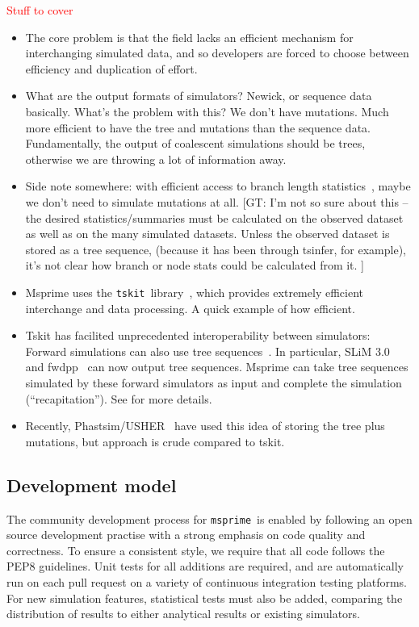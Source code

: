 \documentclass{article}
\newcommand{\msprime}[0]{\texttt{msprime}}
\newcommand{\tskit}[0]{\texttt{tskit}}
\newcommand{\jkcomment}[1]{\textcolor{red}{#1}}
\begin{document}
\jkcomment{Stuff to cover}
\begin{itemize}

\item The core problem is that the field lacks an efficient mechanism for
    interchanging simulated data, and so developers are forced to choose
    between efficiency and duplication of effort.

\item What are the output formats of simulators? Newick, or sequence data
    basically. What's the problem with this? We don't have mutations.
    Much more efficient to have the tree and mutations than the
    sequence data. Fundamentally, the output of coalescent simulations
    should be trees, otherwise we are throwing a lot of information
    away.

\item Side note somewhere: with efficient access to branch length
    statistics~\citep{ralph2019efficiently}, maybe we don't need to
    simulate mutations at all.
[GT: I'm not so sure about this -- the desired statistics/summaries
must be calculated on the observed dataset as well as on the many
simulated datasets.
Unless the observed dataset is stored as a tree sequence,
(because it has been through tsinfer, for example),
it's not clear how branch or node stats could be calculated
from it.
]

\item Msprime uses the \tskit\ library~\citep{tskit2021tskit}, which provides
    extremely efficient interchange and data processing. A quick example
    of how efficient.

\item Tskit has facilited unprecedented interoperability between simulators:
    Forward simulations can also use tree
    sequences~\citep{kelleher2018efficient,haller2018tree}. In particular, SLiM
    3.0~\citep{haller2019slim} and fwdpp~\citep{thornton2014cpp} can now output
    tree sequences. Msprime can take tree sequences simulated by these forward
    simulators as input and complete the simulation (``recapitation'').
    See \cite{haller2018tree} for more details.

\item Recently, Phastsim/USHER~\cite{demaio2021phastsim,turakhia2021ultrafast}
    have used this idea of storing the
    tree plus mutations, but approach is crude compared to tskit.

\end{itemize}

\subsection{Development model}
The community development process for \msprime\ is enabled by following an
open source development practise with a strong emphasis on code quality
and correctness. To ensure a consistent style, we require that all code
follows the PEP8 guidelines. Unit tests for all additions are required, and
are automatically run on each pull request on a variety of continuous
integration testing platforms. For new simulation features, statistical tests
must also be added, comparing the distribution of results to either analytical
results or existing simulators.
\end{document}

